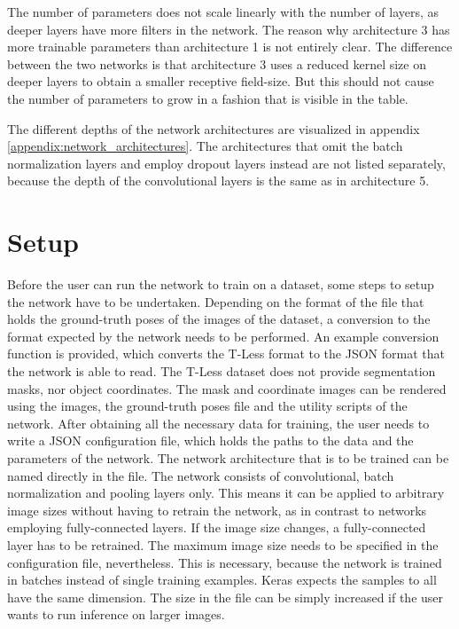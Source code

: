 The number of parameters does not scale linearly with the number of layers, as deeper layers have more filters in the network. The reason why architecture 3 has more trainable parameters than architecture 1 is not entirely clear. The difference between the two networks is that architecture 3 uses a reduced kernel size on deeper layers to obtain a smaller receptive field-size. But this should not cause the number of parameters to grow in a fashion that is visible in the table.

The different depths of the network architectures are visualized in appendix \ref{appendix:network_architectures}. The architectures that omit the batch normalization layers and employ dropout layers instead are not listed separately, because the depth of the convolutional layers is the same as in architecture 5.

\section{Setup}

Before the user can run the network to train on a dataset, some steps to setup the network have to be undertaken. Depending on the format of the file that holds the ground-truth poses of the images of the dataset, a conversion to the format expected by the network needs to be performed. An example conversion function is provided, which converts the T-Less format to the JSON format that the network is able to read. The T-Less dataset does not provide segmentation masks, nor object coordinates. The mask and coordinate images can be rendered using the images, the ground-truth poses file and the utility scripts of the network. After obtaining all the necessary data for training, the user needs to write a JSON configuration file, which holds the paths to the data and the parameters of the network. The network architecture that is to be trained can be named directly in the file. The network consists of convolutional, batch normalization and pooling layers only. This means it can be applied to arbitrary image sizes without having to retrain the network, as in contrast to networks employing fully-connected layers. If the image size changes, a fully-connected layer has to be retrained. The maximum image size needs to be specified in the configuration file, nevertheless. This is necessary, because the network is trained in batches instead of single training examples. Keras expects the samples to all have the same dimension. The size in the file can be simply increased if the user wants to run inference on larger images.

